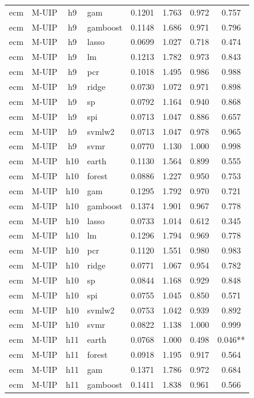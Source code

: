 \begin{ThreePartTable}
\begin{longtable}[t]{llclcccc}
ecm & M-UIP & h9 & gam & 0.1201 & 1.763 & 0.972 & 0.757\\
ecm & M-UIP & h9 & gamboost & 0.1148 & 1.686 & 0.971 & 0.796\\
ecm & M-UIP & h9 & lasso & 0.0699 & 1.027 & 0.718 & 0.474\\
ecm & M-UIP & h9 & lm & 0.1213 & 1.782 & 0.973 & 0.843\\
ecm & M-UIP & h9 & pcr & 0.1018 & 1.495 & 0.986 & 0.988\\
ecm & M-UIP & h9 & ridge & 0.0730 & 1.072 & 0.971 & 0.898\\
ecm & M-UIP & h9 & sp & 0.0792 & 1.164 & 0.940 & 0.868\\
ecm & M-UIP & h9 & spi & 0.0713 & 1.047 & 0.886 & 0.657\\
ecm & M-UIP & h9 & svmlw2 & 0.0713 & 1.047 & 0.978 & 0.965\\
ecm & M-UIP & h9 & svmr & 0.0770 & 1.130 & 1.000 & 0.998\\
\addlinespace
ecm & M-UIP & h10 & earth & 0.1130 & 1.564 & 0.899 & 0.555\\
ecm & M-UIP & h10 & forest & 0.0886 & 1.227 & 0.950 & 0.753\\
ecm & M-UIP & h10 & gam & 0.1295 & 1.792 & 0.970 & 0.721\\
ecm & M-UIP & h10 & gamboost & 0.1374 & 1.901 & 0.967 & 0.778\\
ecm & M-UIP & h10 & lasso & 0.0733 & 1.014 & 0.612 & 0.345\\
ecm & M-UIP & h10 & lm & 0.1296 & 1.794 & 0.969 & 0.778\\
ecm & M-UIP & h10 & pcr & 0.1120 & 1.551 & 0.980 & 0.983\\
ecm & M-UIP & h10 & ridge & 0.0771 & 1.067 & 0.954 & 0.782\\
ecm & M-UIP & h10 & sp & 0.0844 & 1.168 & 0.929 & 0.848\\
ecm & M-UIP & h10 & spi & 0.0755 & 1.045 & 0.850 & 0.571\\
ecm & M-UIP & h10 & svmlw2 & 0.0753 & 1.042 & 0.939 & 0.892\\
ecm & M-UIP & h10 & svmr & 0.0822 & 1.138 & 1.000 & 0.999\\
\addlinespace
ecm & M-UIP & h11 & earth & 0.0768 & 1.000 & 0.498 & 0.046**\\
ecm & M-UIP & h11 & forest & 0.0918 & 1.195 & 0.917 & 0.564\\
ecm & M-UIP & h11 & gam & 0.1371 & 1.786 & 0.972 & 0.684\\
ecm & M-UIP & h11 & gamboost & 0.1411 & 1.838 & 0.961 & 0.566\\

\end{longtable}
\end{ThreePartTable}
